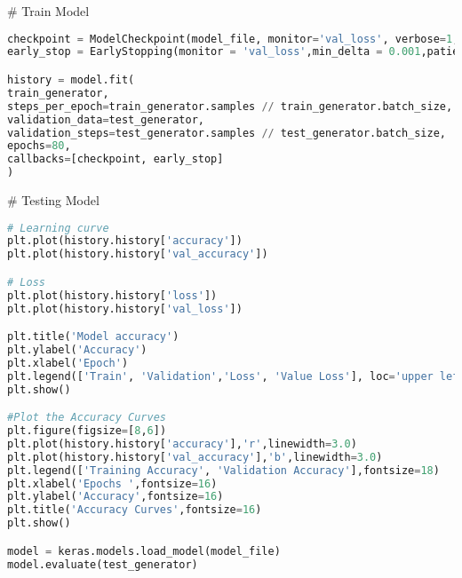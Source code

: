 # Train Model
\begin{lstlisting}[language=Python]
checkpoint = ModelCheckpoint(model_file, monitor='val_loss', verbose=1, save_best_only=True, mode='min')
early_stop = EarlyStopping(monitor = 'val_loss',min_delta = 0.001,patience = 20,mode = 'min',restore_best_weights = True,verbose = 1)

history = model.fit(
train_generator,
steps_per_epoch=train_generator.samples // train_generator.batch_size,
validation_data=test_generator,
validation_steps=test_generator.samples // test_generator.batch_size,
epochs=80,
callbacks=[checkpoint, early_stop]
)
\end{lstlisting}

# Testing Model
\begin{lstlisting}[language=Python]
# Learning curve
plt.plot(history.history['accuracy'])
plt.plot(history.history['val_accuracy'])

# Loss
plt.plot(history.history['loss'])
plt.plot(history.history['val_loss'])

plt.title('Model accuracy')
plt.ylabel('Accuracy')
plt.xlabel('Epoch')
plt.legend(['Train', 'Validation','Loss', 'Value Loss'], loc='upper left')
plt.show()

#Plot the Accuracy Curves
plt.figure(figsize=[8,6])
plt.plot(history.history['accuracy'],'r',linewidth=3.0)
plt.plot(history.history['val_accuracy'],'b',linewidth=3.0)
plt.legend(['Training Accuracy', 'Validation Accuracy'],fontsize=18)
plt.xlabel('Epochs ',fontsize=16)
plt.ylabel('Accuracy',fontsize=16)
plt.title('Accuracy Curves',fontsize=16)
plt.show()

model = keras.models.load_model(model_file)
model.evaluate(test_generator)
\end{lstlisting}

